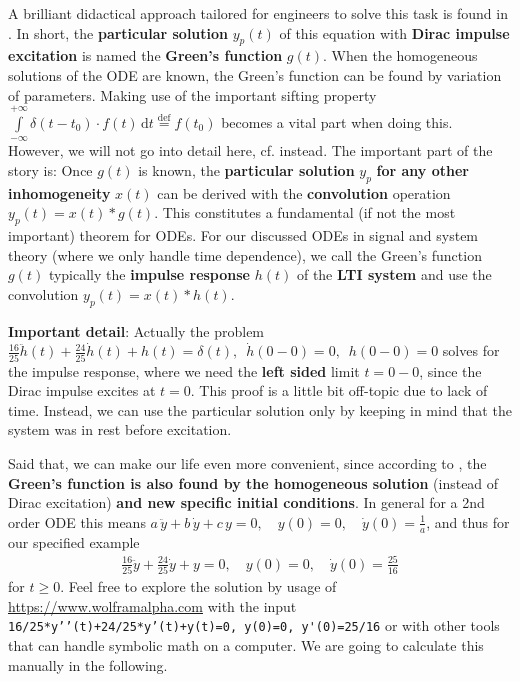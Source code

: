 %
A brilliant didactical approach tailored for engineers to solve this task is
found in \cite{Strang2014}.
%
In short, the \textbf{particular solution} $y_p(t)$ of this equation
with \textbf{Dirac impulse excitation} is named the \textbf{Green's function} $g(t)$.
%
When the homogeneous solutions of the ODE are known, the Green's function can be found
by variation of parameters.
Making use of the important sifting property
$\int\limits_{-\infty}^{+\infty} \delta(t-t_0) \cdot f(t) \, \mathrm{d} t \stackrel{\mathrm{def}}= f(t_0)$
becomes a vital part when doing this.
%
However, we will not go into detail here, cf. \cite[p.133]{Strang2014} instead.
%
\label{pg:sig_sys_ex_03AddOn:convolution}
The important part of the story is:
Once $g(t)$ is known,
the \textbf{particular solution} $y_p$ \textbf{for any other inhomogeneity}
$x(t)$ can be derived with the \textbf{convolution} operation
$y_p(t) = x(t) * g(t)$.
%
This constitutes a fundamental (if not the most important) theorem for ODEs.
%
For our discussed ODEs in signal and
system theory (where we only handle time dependence), we call the Green's
function $g(t)$ typically the \textbf{impulse response} $h(t)$ of the
\textbf{LTI system} and use the convolution $y_p(t) = x(t) * h(t)$.

\textbf{Important detail}: Actually the problem
$\frac{16}{25} \ddot{h}(t) + \frac{24}{25} \dot{h}(t) + h(t) = \delta(t),\,\,\,
\dot{h}(0-0)=0,\,\,\,h(0-0)=0$
solves for the impulse response, where we need the \textbf{left sided}
limit $t=0-0$, since the Dirac impulse excites at $t=0$.
%
This proof is a little bit off-topic due to lack of time.
%
Instead, we can use the particular solution only by keeping in
mind that the system was in rest before excitation.

Said that, we can make our life even more convenient, since according to
\cite[p.97]{Strang2014},
the \textbf{Green's function is also found by the homogeneous solution}
(instead of Dirac excitation)
\textbf{and new specific initial conditions}.
In general for a 2nd order ODE this means
$a \, \ddot{y} + b \, \dot{y} + c \, y = 0,
\quad y(0)=0,
\quad \dot{y}(0)=\frac{1}{a}$,
and thus for our specified example
\begin{align}
\frac{16}{25} \ddot{y} + \frac{24}{25} \dot{y} + y = 0,
\quad y(0)=0,
\quad \dot{y}(0)=\frac{25}{16}
\end{align}
for $t\geq 0$.
%
Feel free to explore the solution by usage of \url{https://www.wolframalpha.com}
with the input \verb|16/25*y’’(t)+24/25*y’(t)+y(t)=0, y(0)=0, y'(0)=25/16|
or with other tools that can handle symbolic math on a computer.
%
We are going to calculate this manually in the following.
%


